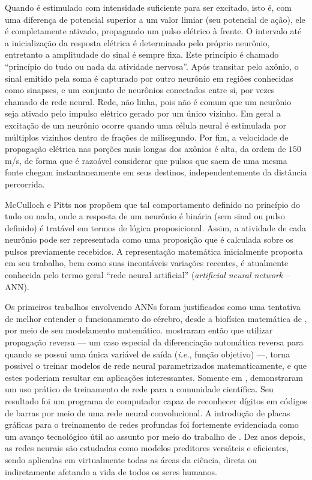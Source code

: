     Quando é estimulado com intensidade suficiente para ser excitado, isto é, com uma diferença de potencial superior a um valor limiar (seu potencial de ação), ele é completamente ativado, propagando um pulso elétrico à frente. O intervalo até a inicialização da resposta elétrica é determinado pelo próprio neurônio, entretanto a amplitudade do sinal é sempre fixa. Este princípio é chamado ``princípio do tudo ou nada da atividade nervosa''. Após transitar pelo axônio, o sinal emitido pela soma é capturado por outro neurônio em regiôes conhecidas como sinapses, e um conjunto de neurônios conectados entre si, por vezes chamado de rede neural. Rede, não linha, pois não é comum que um neurônio seja ativado pelo impulso elétrico gerado por um único vizinho. Em geral a excitação de um neurônio ocorre quando uma célula neural é estimulada por múltiplos vizinhos dentro de frações de milisegundo. Por fim, a velocidade de propagação elétrica nas porções mais longas dos axônios é alta, da ordem de $150$ m/s, de forma que é razoável considerar que pulsos que saem de uma mesma fonte chegam instantaneamente em seus destinos, independentemente da distância percorrida.

    McCulloch e Pitts nos propõem que tal comportamento definido no princípio do tudo ou nada, onde a resposta de um neurônio é binária (sem sinal ou pulso definido) é tratável em termos de lógica proposicional. Assim, a atividade de cada neurônio pode ser representada como uma proposição que é calculada sobre os pulsos previamente recebidos. A representação matemática inicialmente proposta em seu trabalho, bem como suas incontáveis variações recentes, é atualmente conhecida pelo termo geral ``rede neural artificial'' (\textit{artificial neural network} -- ANN).

    Os primeiros trabalhos envolvendo ANNs foram justificados como uma tentativa de melhor entender o funcionamento do cérebro, desde a biofísica matemática de , por meio de seu modelamento matemático.  mostraram então que utilizar propagação reversa --- um caso especial da diferenciação automática reversa para quando se possui uma única variável de saída (\textit{i.e.}, função objetivo) ---, torna possivel o treinar modelos de rede neural parametrizados matematicamente, e que estes poderiam resultar em aplicações interessantes. Somente em ,  demonstraram um uso prático de treinamento de rede para a comunidade científica. Seu resultado foi um programa de computador capaz de reconhecer dígitos em códigos de barras por meio de uma rede neural convolucional. A introdução de placas gráficas para o treinamento de redes profundas foi fortemente evidenciada como um avanço tecnológico útil ao assunto por meio do trabalho de . Dez anos depois, as redes neurais são estudadas como modelos preditores versáteis e eficientes, sendo aplicadas em virtualmente todas as áreas da ciência, direta ou indiretamente afetando a vida de todos os seres humanos.

